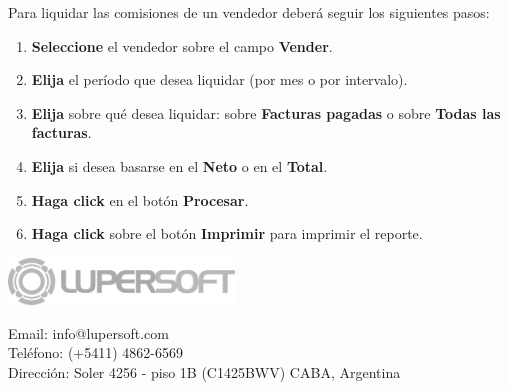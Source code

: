 \documentclass{book}
\begin{document}
Para liquidar las comisiones de un vendedor deberá seguir los siguientes pasos:

\begin{enumerate}
	\itemsep=8pt \topsep=0pt \partopsep=0pt \parskip=0pt \parsep=0pt
	
	\item \textbf{Seleccione} el vendedor sobre el campo \textbf{Vender}.

	\item \textbf{Elija} el período que desea liquidar (por mes o por intervalo).

	\item \textbf{Elija} sobre qué desea liquidar: sobre \textbf{Facturas pagadas} o sobre \textbf{Todas las facturas}.

	\item \textbf{Elija} si desea basarse en el \textbf{Neto} o en el \textbf{Total}.

	\item \textbf{Haga click} en el botón \textbf{Procesar}.

	\item \textbf{Haga click} sobre el botón \textbf{Imprimir} para imprimir el reporte.

\end{enumerate}
\medskip

\newpage
\thispagestyle{empty}

\bigskip\bigskip\bigskip\bigskip

\begin{center}

	\includegraphics[width=6cm]{images/lupersoft-isotipo-fondo-blanco.png} \\

	\bigskip\bigskip

	\large{Email: info@lupersoft.com} \\
	\large{Teléfono: (+5411) 4862-6569} \\
	\large{Dirección: Soler 4256 - piso 1B (C1425BWV) CABA, Argentina} \\

\end{center}
\end{document}
